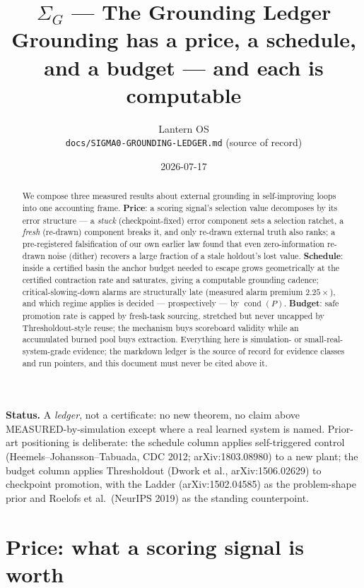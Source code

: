 \documentclass[11pt]{article}
\title{\textbf{$\Sigma_G$ --- The Grounding Ledger}\\[4pt]
\large Grounding has a price, a schedule, and a budget --- and each is computable}
\author{Lantern OS \\ \texttt{docs/SIGMA0-GROUNDING-LEDGER.md} (source of record)}
\date{2026-07-17}
\DeclareMathOperator{\cond}{cond}
\begin{document}
\maketitle

\begin{abstract}
We compose three measured results about external grounding in self-improving loops into one
accounting frame. \textbf{Price}: a scoring signal's selection value decomposes by its error
structure --- a \emph{stuck} (checkpoint-fixed) error component sets a selection ratchet, a
\emph{fresh} (re-drawn) component breaks it, and only re-drawn external truth also ranks;
a pre-registered falsification of our own earlier law found that even zero-information
re-drawn noise (dither) recovers a large fraction of a stale holdout's lost value.
\textbf{Schedule}: inside a certified basin the anchor budget needed to escape grows
geometrically at the certified contraction rate and saturates, giving a computable grounding
cadence; critical-slowing-down alarms are structurally late (measured alarm premium
$2.25\times$), and which regime applies is decided --- prospectively --- by $\cond(P)$.
\textbf{Budget}: safe promotion rate is capped by fresh-task sourcing, stretched but never
uncapped by Thresholdout-style reuse; the mechanism buys scoreboard validity while an
accumulated burned pool buys extraction. Everything here is simulation- or
small-real-system-grade evidence; the markdown ledger is the source of record for evidence
classes and run pointers, and this document must never be cited above it.
\end{abstract}

\begin{caveatbox}
\textbf{Status.} A \emph{ledger}, not a certificate: no new theorem, no claim above
MEASURED-by-simulation except where a real learned system is named. Prior-art positioning is
deliberate: the schedule column applies self-triggered control (Heemels--Johansson--Tabuada,
CDC 2012; arXiv:1803.08980) to a new plant; the budget column applies Thresholdout (Dwork et
al., arXiv:1506.02629) to checkpoint promotion, with the Ladder (arXiv:1502.04585) as the
problem-shape prior and Roelofs et al.\ (NeurIPS 2019) as the standing counterpoint.
\end{caveatbox}

\section{Price: what a scoring signal is worth}
\end{document}
